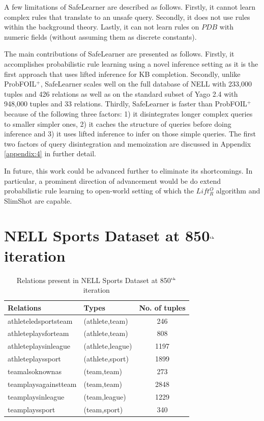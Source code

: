 \documentclass[akbc,twoside,11pt]{article}
\newcommand{\algorithmname}{SafeLearner\xspace}
\begin{document}
A few limitations of \algorithmname are described as follows. Firstly, it cannot learn complex rules that translate to an unsafe query. Secondly, it does not use rules within the background theory. %
Lastly, it can not learn rules on $PDB$ with numeric fields (without assuming them as discrete constants).

The main contributions of \algorithmname are presented as follows. Firstly, it accomplishes probabilistic rule learning using a novel inference setting as it is the first approach that uses lifted inference for KB completion. Secondly, unlike ProbFOIL$^+$, \algorithmname scales well on the full database of NELL with 233,000 tuples and 426 relations as well as on the standard subset of Yago 2.4 with 948,000 tuples and 33 relations. Thirdly, \algorithmname is faster than ProbFOIL$^+$ because of the following three factors: 1) it disintegrates longer complex queries to smaller simpler ones, 2) it caches the structure of queries before doing inference and 3) it uses lifted inference to infer on those simple queries. The first two factors of query disintegration and memoization are discussed in Appendix \ref{appendix:4} in further detail.

In future, this work could be advanced further to eliminate its shortcomings. In particular, a prominent direction of advancement would be do extend probabilistic rule learning to open-world setting of which the $Lift^O_R$ algorithm \cite{DBLP:conf/kr/CeylanDB16} and SlimShot are capable.




\appendix
\section{NELL Sports Dataset at 850$^{\mbox{\tiny th}}$ iteration}\label{appendix:1}

\begin{table}[H]
\centering
\begin{tabular}{ll|c}
Relations			&Types				& No. of tuples\\
\hline
athleteledsportsteam&(athlete,team) 	& 246\\
athleteplaysforteam	&(athlete,team)		& 808\\
athleteplaysinleague&(athlete,league) 	& 1197\\
athleteplayssport	&(athlete,sport) 	& 1899\\
teamalsoknownas	    &(team,team) 		& 273\\
teamplaysagainstteam&(team,team) 		& 2848\\
teamplaysinleague	&(team,league) 		& 1229\\
teamplayssport		&(team,sport) 		& 340\\
\end{tabular}
\caption{Relations present in NELL Sports Dataset at 850$^{\mbox{\tiny th}}$ iteration}\label{table:nell}
\end{table}
\end{document}
